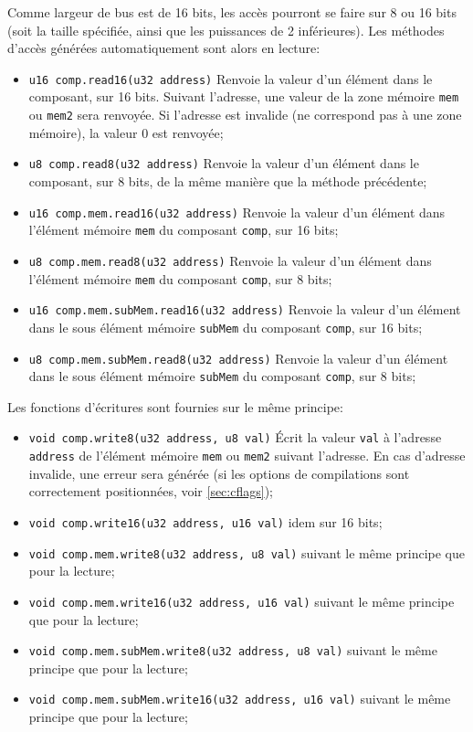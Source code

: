 Comme largeur de bus est de 16 bits, les accès pourront se faire sur 8 ou 16 bits (soit la taille spécifiée, ainsi que les puissances de 2 inférieures). Les méthodes d'accès générées automatiquement sont alors en lecture:
\begin{itemize}
\item \texttt{u16 comp.read16(u32 address)} Renvoie la valeur d'un élément dans le composant, sur 16 bits. Suivant l'adresse, une valeur de la zone mémoire \texttt{mem} ou \texttt{mem2} sera renvoyée. Si l'adresse est invalide (ne correspond pas à une zone mémoire), la valeur 0 est renvoyée;
\item \texttt{u8  comp.read8(u32 address)} Renvoie la valeur d'un élément dans le composant, sur 8 bits, de la même manière que la méthode précédente;
\item \texttt{u16  comp.mem.read16(u32 address)} Renvoie la valeur d'un élément dans l'élément mémoire \texttt{mem} du composant \texttt{comp}, sur 16 bits;
\item \texttt{u8  comp.mem.read8(u32 address)} Renvoie la valeur d'un élément dans l'élément mémoire \texttt{mem} du composant \texttt{comp}, sur 8 bits;
\item \texttt{u16  comp.mem.subMem.read16(u32 address)} Renvoie la valeur d'un élément dans le sous élément mémoire \texttt{subMem} du composant \texttt{comp}, sur 16 bits;
\item \texttt{u8  comp.mem.subMem.read8(u32 address)} Renvoie la valeur d'un élément dans le sous élément mémoire \texttt{subMem} du composant \texttt{comp}, sur 8 bits;
\end{itemize}
Les fonctions d'écritures sont fournies sur le même principe:
\begin{itemize}
\item \texttt{void  comp.write8(u32 address, u8 val)} Écrit la valeur \texttt{val} à l'adresse \texttt{address} de l'élément mémoire \texttt{mem} ou \texttt{mem2} suivant l'adresse. En cas d'adresse invalide, une erreur sera générée (si les options de compilations sont correctement positionnées, voir \ref{sec:cflags});
\item \texttt{void  comp.write16(u32 address, u16 val)} idem sur 16 bits;
\item \texttt{void  comp.mem.write8(u32 address, u8 val)} suivant le même principe que pour la lecture;
\item \texttt{void  comp.mem.write16(u32 address, u16 val)} suivant le même principe que pour la lecture;
\item \texttt{void  comp.mem.subMem.write8(u32 address, u8 val)} suivant le même principe que pour la lecture;
\item \texttt{void  comp.mem.subMem.write16(u32 address, u16 val)} suivant le même principe que pour la lecture;
\end{itemize}

